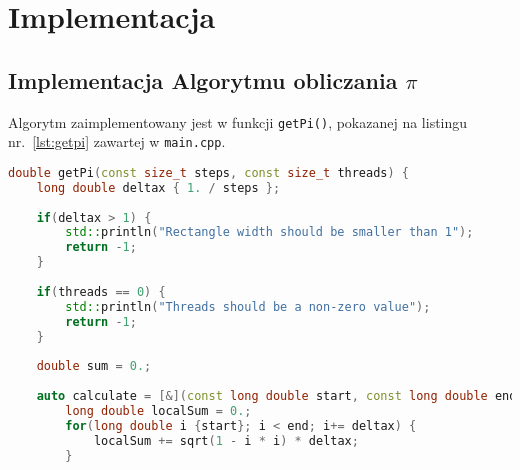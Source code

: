 	\newpage
\section{Implementacja}		%

\subsection{Implementacja Algorytmu obliczania $\pi$}

Algorytm zaimplementowany jest w funkcji \texttt{getPi()}, pokazanej na listingu nr.~\ref{lst:getpi} zawartej w \texttt{main.cpp}.

\begin{lstlisting}[caption=Funkcja \texttt{getPi()}, label={lst:getpi}, language=C++]
double getPi(const size_t steps, const size_t threads) {                               
	long double deltax { 1. / steps };                                               
                                                                                     
	if(deltax > 1) {                                                                 
		std::println("Rectangle width should be smaller than 1");                    
		return -1;                                                                   
	}                                                                                
                                                                                     
	if(threads == 0) {                                                               
		std::println("Threads should be a non-zero value");                          
		return -1;                                                                   
	}                                                                                
                                                                                     
	double sum = 0.;                                                                 
		                                                                             
	auto calculate = [&](const long double start, const long double end) {           
		long double localSum = 0.;                                                   
		for(long double i {start}; i < end; i+= deltax) {                            
			localSum += sqrt(1 - i * i) * deltax;                                    
		}                                                                            
                                                                                     

\end{lstlisting}
